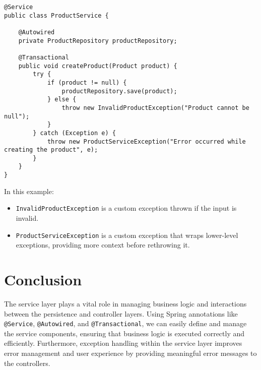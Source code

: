 \documentclass{article}
\begin{document}
\begin{lstlisting}[caption={Custom Exception Handling in the Service Layer}]
@Service
public class ProductService {

    @Autowired
    private ProductRepository productRepository;

    @Transactional
    public void createProduct(Product product) {
        try {
            if (product != null) {
                productRepository.save(product);
            } else {
                throw new InvalidProductException("Product cannot be null");
            }
        } catch (Exception e) {
            throw new ProductServiceException("Error occurred while creating the product", e);
        }
    }
}
\end{lstlisting}

In this example:

\begin{itemize}
    \item \texttt{InvalidProductException} is a custom exception thrown if the input is invalid.
    \item \texttt{ProductServiceException} is a custom exception that wraps lower-level exceptions, providing more context before rethrowing it.
\end{itemize}

\section{Conclusion}
The service layer plays a vital role in managing business logic and interactions between the persistence and controller layers. Using Spring annotations like \texttt{@Service}, \texttt{@Autowired}, and \texttt{@Transactional}, we can easily define and manage the service components, ensuring that business logic is executed correctly and efficiently. Furthermore, exception handling within the service layer improves error management and user experience by providing meaningful error messages to the controllers.
\end{document}
